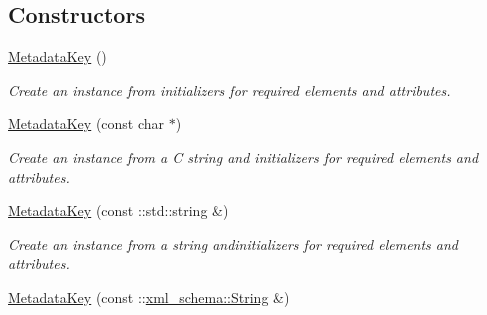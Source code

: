 \subsection*{Constructors}
\begin{DoxyCompactItemize}
\item 
\hypertarget{classopenstack_1_1xml_1_1MetadataKey_a4cb06a8e4339a214f2d0a2efe6f078b8}{
\hyperlink{classopenstack_1_1xml_1_1MetadataKey_a4cb06a8e4339a214f2d0a2efe6f078b8}{MetadataKey} ()}
\label{classopenstack_1_1xml_1_1MetadataKey_a4cb06a8e4339a214f2d0a2efe6f078b8}

\begin{DoxyCompactList}\small\item\em Create an instance from initializers for required elements and attributes. \item\end{DoxyCompactList}\item 
\hypertarget{classopenstack_1_1xml_1_1MetadataKey_aa284fa9b134ef69d64519a2188d9e629}{
\hyperlink{classopenstack_1_1xml_1_1MetadataKey_aa284fa9b134ef69d64519a2188d9e629}{MetadataKey} (const char $\ast$)}
\label{classopenstack_1_1xml_1_1MetadataKey_aa284fa9b134ef69d64519a2188d9e629}

\begin{DoxyCompactList}\small\item\em Create an instance from a C string and initializers for required elements and attributes. \item\end{DoxyCompactList}\item 
\hypertarget{classopenstack_1_1xml_1_1MetadataKey_a96c76dae4ab7cdca0b9b1f00a7c8c3df}{
\hyperlink{classopenstack_1_1xml_1_1MetadataKey_a96c76dae4ab7cdca0b9b1f00a7c8c3df}{MetadataKey} (const ::std::string \&)}
\label{classopenstack_1_1xml_1_1MetadataKey_a96c76dae4ab7cdca0b9b1f00a7c8c3df}

\begin{DoxyCompactList}\small\item\em Create an instance from a string andinitializers for required elements and attributes. \item\end{DoxyCompactList}\item 
\hypertarget{classopenstack_1_1xml_1_1MetadataKey_a5978638a7e5e38678830d2dc32909aa2}{
\hyperlink{classopenstack_1_1xml_1_1MetadataKey_a5978638a7e5e38678830d2dc32909aa2}{MetadataKey} (const ::\hyperlink{namespacexml__schema_af6757b5701ccc893f3b551bd70e0c94d}{xml\_\-schema::String} \&)}
\label{classopenstack_1_1xml_1_1MetadataKey_a5978638a7e5e38678830d2dc32909aa2}


\end{DoxyCompactItemize}
